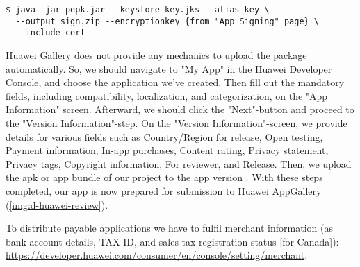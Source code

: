 \begin{lstlisting}[language=terminal]
$ java -jar pepk.jar --keystore key.jks --alias key \
  --output sign.zip --encryptionkey {from "App Signing" page} \
  --include-cert
\end{lstlisting}


\noindent Huawei Gallery does not provide any mechanics to upload the package automatically. So, we should navigate to 
"My App" in the Huawei Developer Console, and choose the application we've created. Then fill out the mandatory fields, 
including compatibility, localization, and categorization, on the "App Information" screen. Afterward, we should click 
the "Next"-button and proceed to the "Version Information"-step. On the "Version Information"-screen, we provide details 
for various fields such as Country/Region for release, Open testing, Payment information, In-app purchases, Content 
rating, Privacy statement, Privacy tags, Copyright information, For reviewer, and Release. Then, we upload the apk or 
app bundle of our project to the app version \issue{286}{}. With these steps completed, our app is now prepared for 
submission to Huawei AppGallery (\cref{img:d-huawei-review}).


\noindent To distribute payable applications we have to fulfil merchant information (as bank account details, TAX ID, 
and sales tax registration status [for Canada]):
\href{https://developer.huawei.com/consumer/en/console/setting/merchant}{https://developer.huawei.com/consumer/en/console/setting/merchant}.

